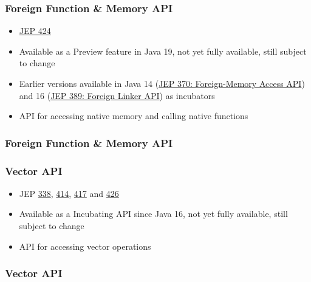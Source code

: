 \documentclass{beamer}
\begin{document}
\begin{frame}
\frametitle{Foreign Function \& Memory API}
\begin{itemize}
  \item \href{https://openjdk.org/jeps/424}{JEP 424}
  \item Available as a Preview feature in Java 19, not yet fully available, still subject to change
  \item Earlier versions available in Java 14 (\href{https://openjdk.org/jeps/370}{JEP 370: Foreign-Memory Access API}) and 16 (\href{https://openjdk.org/jeps/389}{JEP 389: Foreign Linker API}) as incubators
  \pause
  \item API for accessing native memory and calling native functions
\end{itemize}
\end{frame}
\begin{frame}
\frametitle{Foreign Function \& Memory API}

\end{frame}

\begin{frame}
\frametitle{Vector API}
\begin{itemize}
  \item JEP \href{https://openjdk.org/jeps/338}{338}, \href{https://openjdk.org/jeps/414}{414}, \href{https://openjdk.org/jeps/417}{417} and \href{https://openjdk.org/jeps/426}{426}
  \item Available as a Incubating API since Java 16, not yet fully available, still subject to change
  \pause
  \item API for accessing vector operations
\end{itemize}
\end{frame}
\begin{frame}
\frametitle{Vector API}

\end{frame}
\end{document}
